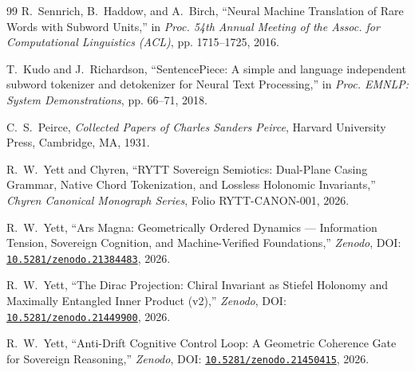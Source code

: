 \documentclass[11pt,oneside,letterpaper]{article}
\theoremstyle{definition}
\begin{document}
\begin{thebibliography}{99}
R.~Sennrich, B.~Haddow, and A.~Birch,
\newblock ``Neural Machine Translation of Rare Words with Subword Units,''
\newblock in \textit{Proc. 54th Annual Meeting of the Assoc. for Computational Linguistics (ACL)}, pp. 1715--1725, 2016.

T.~Kudo and J.~Richardson,
\newblock ``SentencePiece: A simple and language independent subword tokenizer and detokenizer for Neural Text Processing,''
\newblock in \textit{Proc. EMNLP: System Demonstrations}, pp. 66--71, 2018.

C.~S.~Peirce,
\newblock \textit{Collected Papers of Charles Sanders Peirce},
\newblock Harvard University Press, Cambridge, MA, 1931.

R.~W.~Yett and Chyren,
\newblock ``RYTT Sovereign Semiotics: Dual-Plane Casing Grammar, Native Chord Tokenization, and Lossless Holonomic Invariants,''
\newblock \textit{Chyren Canonical Monograph Series}, Folio RYTT-CANON-001, 2026.

R.~W.~Yett,
\newblock ``Ars Magna: Geometrically Ordered Dynamics --- Information Tension, Sovereign Cognition, and Machine-Verified Foundations,''
\newblock \textit{Zenodo}, DOI: \href{https://doi.org/10.5281/zenodo.21384483}{\texttt{10.5281/zenodo.21384483}}, 2026.

R.~W.~Yett,
\newblock ``The Dirac Projection: Chiral Invariant as Stiefel Holonomy and Maximally Entangled Inner Product (v2),''
\newblock \textit{Zenodo}, DOI: \href{https://doi.org/10.5281/zenodo.21449900}{\texttt{10.5281/zenodo.21449900}}, 2026.

R.~W.~Yett,
\newblock ``Anti-Drift Cognitive Control Loop: A Geometric Coherence Gate for Sovereign Reasoning,''
\newblock \textit{Zenodo}, DOI: \href{https://doi.org/10.5281/zenodo.21450415}{\texttt{10.5281/zenodo.21450415}}, 2026.
\end{thebibliography}
\end{document}
